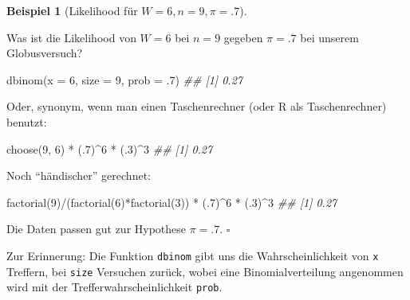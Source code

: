 \documentclass[
  ngerman,
  letterpaper,
  twoside,
  open=any]{scrbook}
\newenvironment{Shaded}{\begin{snugshade}}{\end{snugshade}}
\newcommand{\AttributeTok}[1]{\textcolor[rgb]{0.40,0.45,0.13}{#1}}
\newcommand{\DecValTok}[1]{\textcolor[rgb]{0.68,0.00,0.00}{#1}}
\newcommand{\DocumentationTok}[1]{\textcolor[rgb]{0.37,0.37,0.37}{\textit{#1}}}
\newcommand{\FunctionTok}[1]{\textcolor[rgb]{0.28,0.35,0.67}{#1}}
\newcommand{\NormalTok}[1]{\textcolor[rgb]{0.00,0.23,0.31}{#1}}
\newcommand{\SpecialCharTok}[1]{\textcolor[rgb]{0.37,0.37,0.37}{#1}}
\theoremstyle{definition}
\newtheorem{example}{Beispiel}[chapter]
\theoremstyle{plain}
\theoremstyle{definition}
\theoremstyle{definition}
\theoremstyle{definition}
\newtheorem{example}{Beispiel}[chapter]
\theoremstyle{definition}
\theoremstyle{remark}
\begin{document}
\begin{example}[Likelihood für
\(W = 6, n = 9, \pi=.7\)]\protect\hypertarget{exm-globus697-dbinom}{}\label{exm-globus697-dbinom}

Was ist die Likelihood von \(W=6\) bei \(n=9\) gegeben \(\pi=.7\) bei
unserem Globusversuch?

\begin{Shaded}
\begin{Highlighting}[]
\FunctionTok{dbinom}\NormalTok{(}\AttributeTok{x =} \DecValTok{6}\NormalTok{, }\AttributeTok{size =} \DecValTok{9}\NormalTok{, }\AttributeTok{prob =}\NormalTok{ .}\DecValTok{7}\NormalTok{)}
\DocumentationTok{\#\# [1] 0.27}
\end{Highlighting}
\end{Shaded}

Oder, synonym, wenn man einen Taschenrechner (oder R als Taschenrechner)
benutzt:

\begin{Shaded}
\begin{Highlighting}[]
\FunctionTok{choose}\NormalTok{(}\DecValTok{9}\NormalTok{, }\DecValTok{6}\NormalTok{) }\SpecialCharTok{*}\NormalTok{ (.}\DecValTok{7}\NormalTok{)}\SpecialCharTok{\^{}}\DecValTok{6} \SpecialCharTok{*}\NormalTok{ (.}\DecValTok{3}\NormalTok{)}\SpecialCharTok{\^{}}\DecValTok{3}
\DocumentationTok{\#\# [1] 0.27}
\end{Highlighting}
\end{Shaded}

Noch \enquote{händischer} gerechnet:

\begin{Shaded}
\begin{Highlighting}[]
\FunctionTok{factorial}\NormalTok{(}\DecValTok{9}\NormalTok{)}\SpecialCharTok{/}\NormalTok{(}\FunctionTok{factorial}\NormalTok{(}\DecValTok{6}\NormalTok{)}\SpecialCharTok{*}\FunctionTok{factorial}\NormalTok{(}\DecValTok{3}\NormalTok{)) }\SpecialCharTok{*}\NormalTok{ (.}\DecValTok{7}\NormalTok{)}\SpecialCharTok{\^{}}\DecValTok{6} \SpecialCharTok{*}\NormalTok{ (.}\DecValTok{3}\NormalTok{)}\SpecialCharTok{\^{}}\DecValTok{3}
\DocumentationTok{\#\# [1] 0.27}
\end{Highlighting}
\end{Shaded}

Die Daten passen gut zur Hypothese \(\pi=.7\). \(\square\)

\end{example}

Zur Erinnerung: Die Funktion \texttt{dbinom} gibt uns die
Wahrscheinlichkeit von \texttt{x} Treffern, bei \texttt{size} Versuchen
zurück, wobei eine Binomialverteilung angenommen wird mit der
Trefferwahrscheinlichkeit \texttt{prob}.
\end{document}

